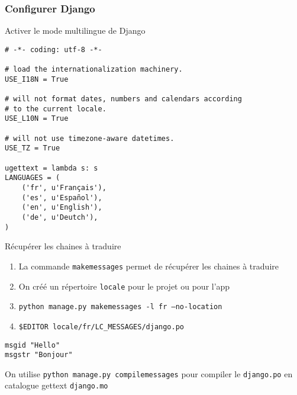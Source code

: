 \documentclass{beamer}
\begin{document}
\begin{frame}[fragile]
  \frametitle{Configurer Django}
  \begin{block}{Activer le mode multilingue de Django}
    \pause
  \begin{lstlisting}
# -*- coding: utf-8 -*-

# load the internationalization machinery.
USE_I18N = True

# will not format dates, numbers and calendars according
# to the current locale.
USE_L10N = True

# will not use timezone-aware datetimes.
USE_TZ = True

ugettext = lambda s: s
LANGUAGES = (
    ('fr', u'Français'),
    ('es', u'Español'),
    ('en', u'English'),
    ('de', u'Deutch'),
)
  \end{lstlisting}


  \end{block}

\end{frame}

\begin{frame}[fragile]
  \begin{exampleblock}{Récupérer les chaines à traduire}
    \begin{enumerate}
      \pause \item La commande \texttt{makemessages} permet de récupérer les chaines à traduire
      \pause \item On créé un répertoire \texttt{locale} pour le projet ou pour l'app
      \pause \item \texttt{python manage.py makemessages -l fr --no-location}
      \pause \item \texttt{\$EDITOR locale/fr/LC\_MESSAGES/django.po}
    \end{enumerate}
  \end{exampleblock}
  \pause

  \begin{lstlisting}
msgid "Hello"
msgstr "Bonjour"
  \end{lstlisting}

\pause
On utilise \texttt{python manage.py compilemessages} pour compiler le \texttt{django.po} en catalogue gettext \texttt{django.mo}

\end{frame}
\end{document}
